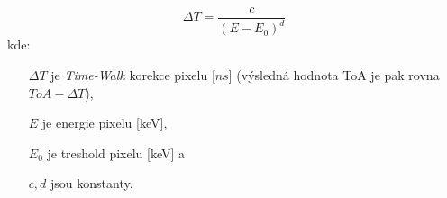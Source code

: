 \begin{equation}\label{eq:det:timeWalk}
	\Delta T = \frac{c}{(E - E_0)^d}
\end{equation}
kde:
\begin{changemargin}{1.5cm}{1cm} 
	\begin{itemize}
		\item [$\Delta T$] je \textit{Time-Walk} korekce pixelu [$ns$] (výsledná hodnota ToA je pak rovna $ToA-\Delta T$),
		\item [$E$] je energie pixelu [keV],
		\item [$E_0$] je treshold pixelu [keV] a
		\item [$c,d$] jsou konstanty.
	\end{itemize}
\end{changemargin}